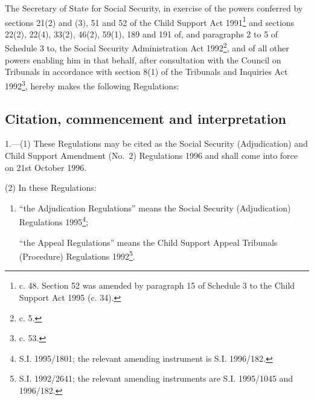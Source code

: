 \documentclass[12pt,a4paper]{article}
\title{\regstitle}
\author{S.I. 1996 No. 2450}
\date{Made 23rd September 1996\\Laid before Parliament 27th September 1996\\Coming into force 21st October 1996}
\begin{document}
\maketitle

\noindent
The Secretary of State for Social Security, in exercise of the powers conferred by sections 21(2) and (3), 51 and 52 of the Child Support Act 1991\footnote{ c. 48. Section 52 was amended by paragraph 15 of Schedule 3 to the Child Support Act 1995 (c. 34).} and sections 22(2), 22(4), 33(2), 46(2), 59(1), 189 and 191 of, and paragraphs 2 to 5 of Schedule 3 to, the Social Security Administration Act 1992\footnote{ c. 5.}, and of all other powers enabling him in that behalf, after consultation with the Council on Tribunals in accordance with section 8(1) of the Tribunals and Inquiries Act 1992\footnote{ c. 53.}, hereby makes the following Regulations:

{\sloppy

\tableofcontents

}

\setcounter{secnumdepth}{-2}

\subsection[1. Citation, commencement and interpretation]{Citation, commencement and interpretation}

1.—(1) These Regulations may be cited as the Social Security (Adjudication) and Child Support Amendment (No.\ 2) Regulations 1996 and shall come into force on 21st October 1996.

(2) In these Regulations:
\begin{enumerate}\item[]
“the Adjudication Regulations” means the Social Security (Adjudication) Regulations 1995\footnote{\frenchspacing S.I. 1995/1801; the relevant amending instrument is S.I. 1996/182.};

“the Appeal Regulations” means the Child Support Appeal Tribunals (Procedure) Regulations 1992\footnote{\frenchspacing S.I. 1992/2641; the relevant amending instruments are S.I. 1995/1045 and 1996/182.}.
\end{enumerate}

\end{document}
